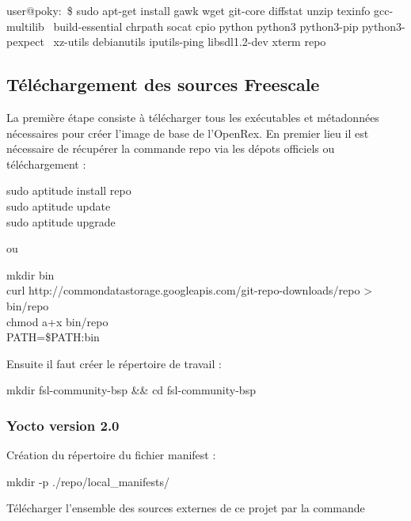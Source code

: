 \begin{tcolorbox}
	user@poky:~\$ sudo apt-get install gawk wget git-core diffstat unzip texinfo gcc-multilib \
	build-essential chrpath socat cpio python python3 python3-pip python3-pexpect \
	xz-utils debianutils iputils-ping libsdl1.2-dev xterm repo
\end{tcolorbox}

\subsection{Téléchargement des sources Freescale}
La première étape consiste à télécharger tous les exécutables et métadonnées nécessaires pour créer l’image de base de l’OpenRex. En premier lieu il est nécessaire de récupérer la commande repo via les dépots officiels ou téléchargement :

\begin{tcolorbox}
	sudo aptitude install repo \\
	sudo aptitude update \\
	sudo aptitude upgrade \\
\end{tcolorbox}

ou

\begin{tcolorbox}
	mkdir bin \\
	curl http://commondatastorage.googleapis.com/git-repo-downloads/repo > bin/repo \\
	chmod a+x bin/repo \\
	PATH=\${PATH}:bin \\
\end{tcolorbox}

Ensuite il faut créer le répertoire de travail :

\begin{tcolorbox}
	mkdir fsl-community-bsp \&\& cd fsl-community-bsp
\end{tcolorbox}

\subsubsection{Yocto version 2.0}

Création du répertoire du fichier manifest :

\begin{tcolorbox}
	mkdir -p ./repo/local\_manifests/
\end{tcolorbox}

Télécharger l’ensemble des sources externes de ce projet par la commande

